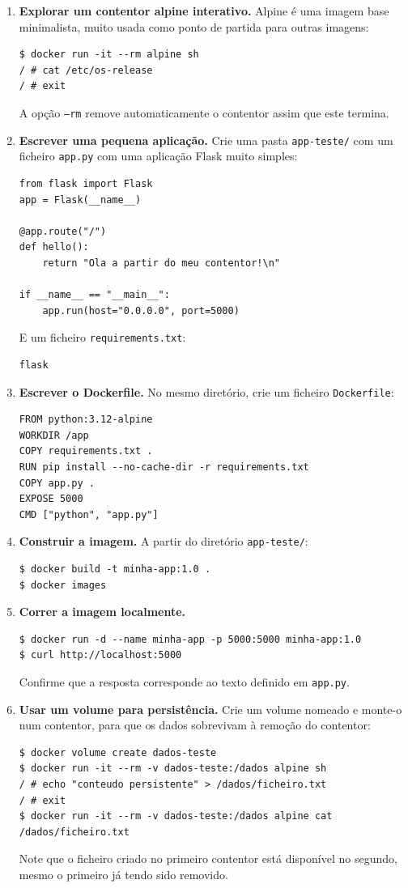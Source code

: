 \documentclass[11pt,a4paper]{article}
\begin{document}
\begin{enumerate}[label=\arabic*.]
  \item \textbf{Explorar um contentor alpine interativo.} Alpine é uma imagem base minimalista, muito usada como ponto de partida para outras imagens:
\begin{lstlisting}
$ docker run -it --rm alpine sh
/ # cat /etc/os-release
/ # exit
\end{lstlisting}
  A opção \texttt{--rm} remove automaticamente o contentor assim que este termina.

  \item \textbf{Escrever uma pequena aplicação.} Crie uma pasta \texttt{app-teste/} com um ficheiro \texttt{app.py} com uma aplicação Flask muito simples:
\begin{lstlisting}
from flask import Flask
app = Flask(__name__)

@app.route("/")
def hello():
    return "Ola a partir do meu contentor!\n"

if __name__ == "__main__":
    app.run(host="0.0.0.0", port=5000)
\end{lstlisting}
  E um ficheiro \texttt{requirements.txt}:
\begin{lstlisting}
flask
\end{lstlisting}

  \item \textbf{Escrever o Dockerfile.} No mesmo diretório, crie um ficheiro \texttt{Dockerfile}:
\begin{lstlisting}
FROM python:3.12-alpine
WORKDIR /app
COPY requirements.txt .
RUN pip install --no-cache-dir -r requirements.txt
COPY app.py .
EXPOSE 5000
CMD ["python", "app.py"]
\end{lstlisting}

  \item \textbf{Construir a imagem.} A partir do diretório \texttt{app-teste/}:
\begin{lstlisting}
$ docker build -t minha-app:1.0 .
$ docker images
\end{lstlisting}

  \item \textbf{Correr a imagem localmente.}
\begin{lstlisting}
$ docker run -d --name minha-app -p 5000:5000 minha-app:1.0
$ curl http://localhost:5000
\end{lstlisting}
  Confirme que a resposta corresponde ao texto definido em \texttt{app.py}.

  \item \textbf{Usar um volume para persistência.} Crie um volume nomeado e monte-o num contentor, para que os dados sobrevivam à remoção do contentor:
\begin{lstlisting}
$ docker volume create dados-teste
$ docker run -it --rm -v dados-teste:/dados alpine sh
/ # echo "conteudo persistente" > /dados/ficheiro.txt
/ # exit
$ docker run -it --rm -v dados-teste:/dados alpine cat /dados/ficheiro.txt
\end{lstlisting}
  Note que o ficheiro criado no primeiro contentor está disponível no segundo, mesmo o primeiro já tendo sido removido.


\end{enumerate}
\end{document}

